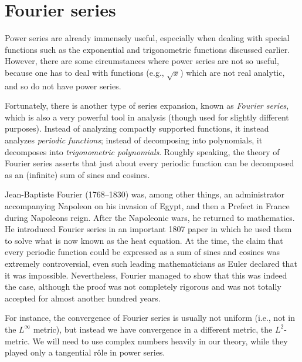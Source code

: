 \chapter{Fourier series}\label{ii:ch:5}

\begin{note}
  Power series are already immensely useful, especially when dealing with special functions such as the exponential and trigonometric functions discussed earlier.
  However, there are some circumstances where power series are not so useful, because one has to deal with functions (e.g., \(\sqrt{x}\)) which are not real analytic, and so do not have power series.
\end{note}

\begin{note}
  Fortunately, there is another type of series expansion, known as \emph{Fourier series}, which is also a very powerful tool in analysis
  (though used for slightly different purposes).
  Instead of analyzing compactly supported functions, it instead analyzes \emph{periodic functions};
  instead of decomposing into polynomials, it decomposes into \emph{trigonometric polynomials}.
  Roughly speaking, the theory of Fourier series asserts that just about every periodic function can be decomposed as an (infinite) sum of sines and cosines.
\end{note}

\begin{rmk}\label{ii:5.0.1}
  Jean-Baptiste Fourier (1768--1830) was, among other things, an administrator accompanying Napoleon on his invasion of Egypt, and then a Prefect in France during Napoleons reign.
  After the Napoleonic wars, he returned to mathematics.
  He introduced Fourier series in an important 1807 paper in which he used them to solve what is now known as the heat equation.
  At the time, the claim that every periodic function could be expressed as a sum of sines and cosines was extremely controversial, even such leading mathematicians as Euler declared that it was impossible.
  Nevertheless, Fourier managed to show that this was indeed the case, although the proof was not completely rigorous and was not totally accepted for almost another hundred years.
\end{rmk}

\begin{note}
  For instance, the convergence of Fourier series is usually not uniform (i.e., not in the \(L^\infty\) metric), but instead we have convergence in a different metric, the \(L^2\)-metric.
  We will need to use complex numbers heavily in our theory, while they played only a tangential rôle in power series.
\end{note}

